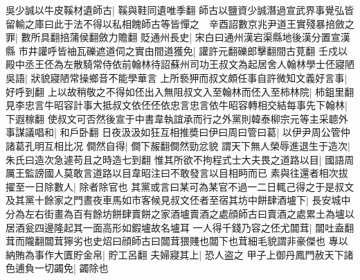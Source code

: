 吳少誠以牛皮鞵材遺師古|{
	鞵與鞋同遺唯季翻}
師古以鹽資少誠潛過宣武界事覺弘皆留輸之庫曰此于法不得以私相餽師古等皆憚之　辛酉詔數京兆尹道王實殘暴掊斂之罪|{
	數所具翻掊蒲侯翻斂力贍翻}
貶通州長史|{
	宋白曰通州漢宕渠縣地後漢分置宣漢縣}
市井讙呼皆䄂瓦礫遮道伺之實由間道獲免|{
	讙許元翻礫郎擊翻間古莧翻}
壬戍以殿中丞王伾為左散騎常侍依前翰林待詔蘇州司功王叔文為起居舍人翰林學士伾寢陋吳語|{
	狀貌寢陋常操鄉音不能學華言}
上所䙝狎而叔文頗任事自許微知文義好言事|{
	好呼到翻}
上以故稍敬之不得如伾出入無阻叔文入至翰林而伾入至柿林院|{
	柿鉏里翻}
見李忠言牛昭容計事大抵叔文依伾伾依忠言忠言依牛昭容轉相交結每事先下翰林|{
	下遐稼翻}
使叔文可否然後宣于中書韋執誼承而行之外黨則韓泰柳宗元等主采聼外事謀議唱和|{
	和戶卧翻}
日夜汲汲如狂互相推奬曰伊曰周曰管曰葛|{
	以伊尹周公管仲諸葛孔明互相比况}
僴然自得|{
	僴下赧翻僴然勁忿貌}
謂天下無人榮辱進退生于造次|{
	朱氏曰造次急遽苟且之時造七到翻}
惟其所欲不拘程式士大夫畏之道路以目|{
	國語周厲王監謗國人莫敢言道路以目韋昭注曰不敢發言以目相眄而已}
素與往還者相次拔擢至一日除數人|{
	除者除官也}
其黨或言曰某可為某官不過一二日輒己得之于是叔文及其黨十餘家之門晝夜車馬如市客候見叔文伾者至宿其坊中餅肆酒壚下|{
	長安城中分為左右街畫為百有餘坊餅肆賣餅之家酒壚賣酒之處顔師古曰賣酒之處累土為壚以居酒瓮四邊隆起其一面高形如鍜壚故名壚耳}
一人得千錢乃容之伾尤闒茸|{
	闒吐盍翻茸而隴翻闒茸獰劣也史炤曰顔師古曰闒茸猥賤也闒下也茸細毛貌謂非豪傑也}
專以納賄為事作大匱貯金帛|{
	貯工呂翻}
夫婦寢其上|{
	恐人盗之}
甲子上御丹鳳門赦天下諸色逋負一切蠲免|{
	蠲除也}


